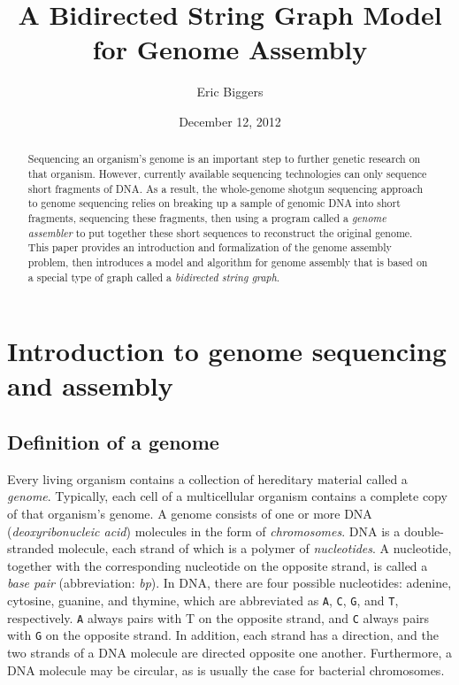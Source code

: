 \documentclass[12pt]{article}
\title{A Bidirected String Graph Model for Genome Assembly}
\author{Eric Biggers}
\date{December 12, 2012}
\newcommand\Base[1]{{\tt #1}}
\newcommand{\KeyTerm}[1]{{\it #1}}
\begin{document}
\maketitle

\begin{abstract}

Sequencing an organism's genome is an important step to further genetic research
on that organism.  However, currently available sequencing technologies can only
sequence short fragments of DNA.  As a result, the whole-genome shotgun
sequencing approach to genome sequencing relies on breaking up a sample of
genomic DNA into short fragments, sequencing these fragments, then using a
program called a {\em genome assembler} to put together these short sequences to
reconstruct the original genome.  This paper provides an introduction and
formalization of the genome assembly problem, then introduces a model and
algorithm for genome assembly that is based on a special type of graph called a
\KeyTerm{bidirected string graph}.  \end{abstract}

\tableofcontents

\section{Introduction to genome sequencing and assembly}

\subsection{Definition of a genome}

\label{sec:genome}

Every living organism contains a collection of hereditary material called a
\KeyTerm{genome}.  Typically, each cell of a multicellular organism contains a
complete copy of that organism's genome.  A genome consists of one or more DNA
(\KeyTerm{deoxyribonucleic acid}) molecules in the form of
\KeyTerm{chromosomes}.  DNA is a double-stranded molecule, each strand of which
is a polymer of \KeyTerm{nucleotides}.  A nucleotide, together with the
corresponding nucleotide on the opposite strand, is called a \KeyTerm{base pair}
(abbreviation: \KeyTerm{bp}).  In DNA, there are four possible nucleotides:
adenine, cytosine, guanine, and thymine, which are abbreviated as \Base{A},
\Base{C}, \Base{G}, and \Base{T}, respectively.  \Base{A} always pairs with T on
the opposite strand, and \Base{C} always pairs with \Base{G} on the opposite strand.
In addition, each strand has a direction, and the two strands of a DNA molecule
are directed opposite one another.  Furthermore, a DNA molecule may be circular,
as is usually the case for bacterial chromosomes.
\end{document}
